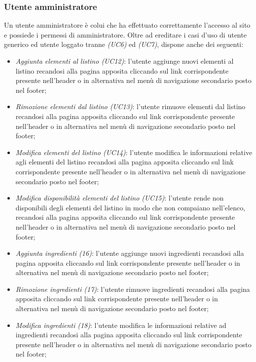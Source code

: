 \subsubsection{Utente amministratore}
Un utente amministratore è colui che ha effettuato correttamente l'accesso al sito e possiede i permessi
di amministratore. Oltre ad ereditare i casi d'uso di utente generico ed utente loggato tranne
\textit{(UC6)} ed \textit{(UC7)}, dispone anche dei seguenti:
\begin{itemize}
	\item \textit{Aggiunta elementi al listino (UC12)}: l'utente aggiunge nuovi elementi al listino
	recandosi alla pagina apposita cliccando sul link corrispondente presente
	nell'header o in alternativa nel menù di navigazione secondario posto nel footer;
	\item \textit{Rimozione elementi dal listino (UC13)}: l'utente rimuove elementi dal listino
	recandosi alla pagina apposita cliccando sul link corrispondente presente
	nell'header o in alternativa nel menù di navigazione secondario posto nel footer;
	\item \textit{Modifica elementi del listino (UC14)}: l'utente modifica le informazioni relative agli
	elementi del listino recandosi alla pagina apposita cliccando sul link corrispondente presente
	nell'header o in alternativa nel menù di navigazione secondario posto nel footer;
	\item \textit{Modifica disponibilità elementi del listino (UC15)}: l'utente rende non disponibili
	degli elementi del listino in modo che non compaiano nell'elenco, recandosi alla pagina apposita
	cliccando sul link corrispondente presente nell'header o in alternativa nel menù di navigazione
	secondario posto nel footer;
	\item \textit{Aggiunta ingredienti (16)}: l'utente aggiunge nuovi ingredienti recandosi alla pagina
	apposita cliccando sul link corrispondente presente nell'header o in alternativa nel menù di
	navigazione secondario posto nel footer;
	\item \textit{Rimozione ingredienti (17)}: l'utente rimuove ingredienti recandosi alla pagina
	apposita cliccando sul link corrispondente presente nell'header o in alternativa nel menù di
	navigazione secondario posto nel footer;
	\item \textit{Modifica ingredienti (18)}: l'utente modifica le informazioni relative ad ingredienti
	recandosi alla pagina apposita cliccando sul link corrispondente presente nell'header o in
	alternativa nel menù di navigazione secondario posto nel footer;
\end{itemize}